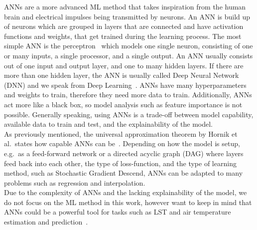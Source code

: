 ANNs are a more advanced ML method that takes inspiration from the human brain and electrical impulses being transmitted by neurons. An ANN is build up of neurons which are grouped in layers that are connected and have activation functions and weights, that get trained during the learning process. The most simple ANN is the perceptron~\cite{rosenblatt1957perceptron} which models one single neuron, consisting of one or many inputs, a single processor, and a single output. An ANN usually consists out of one input and output layer, and one to many hidden layers. If there are more than one hidden layer, the ANN is usually called Deep Neural Network (DNN) and we speak from Deep Learning~\cite{lecun2015deep}. ANNs have many hyperparameters and weights to train, therefore they need more data to train. Additionally, ANNs act more like a black box, so model analysis such as feature importance is not possible. Generally speaking, using ANNs is a trade-off between model capability, available data to train and test, and the explainability of the model.\\
As previously mentioned, the universal approximation theorem by Hornik et al.\ states how capable ANNs can be~\cite{hornik1989multilayer}. Depending on how the model is setup, e.g.\ as a feed-forward network or a directed acyclic graph (DAG) where layers feed back into each other, the type of loss-function, and the type of learning method, such as Stochastic Gradient Descend, ANNs can be adapted to many problems such as regression and interpolation.\\
Due to the complexity of ANNs and the lacking explainability of the model, we do not focus on the ML method in this work, however want to keep in mind that ANNs could be a powerful tool for tasks such as LST and air temperature estimation and prediction~\cite{yuan2020deep}.
